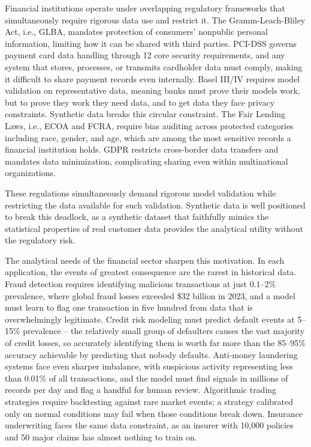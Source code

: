 Financial institutions operate under overlapping regulatory frameworks that simultaneously require rigorous data use and restrict it. The Gramm-Leach-Bliley Act, i.e., GLBA, mandates protection of consumers' nonpublic personal information, limiting how it can be shared with third parties. PCI-DSS governs payment card data handling through 12 core security requirements, and any system that stores, processes, or transmits cardholder data must comply, making it difficult to share payment records even internally. Basel III/IV requires model validation on representative data, meaning banks must prove their models work, but to prove they work they need data, and to get data they face privacy constraints. Synthetic data breaks this circular constraint. The Fair Lending Laws, i.e., ECOA and FCRA, require bias auditing across protected categories including race, gender, and age, which are among the most sensitive records a financial institution holds. GDPR restricts cross-border data transfers and mandates data minimization, complicating sharing even within multinational organizations.

These regulations simultaneously demand rigorous model validation while restricting the data available for such validation. Synthetic data is well positioned to break this deadlock, as a synthetic dataset that faithfully mimics the statistical properties of real customer data provides the analytical utility without the regulatory risk.

The analytical needs of the financial sector sharpen this motivation. In each application, the events of greatest consequence are the rarest in historical data. Fraud detection requires identifying malicious transactions at just 0.1--2\% prevalence, where global fraud losses exceeded \$32 billion in 2023, and a model must learn to flag one transaction in five hundred from data that is overwhelmingly legitimate. Credit risk modeling must predict default events at 5--15\% prevalence -- the relatively small group of defaulters causes the vast majority of credit losses, so accurately identifying them is worth far more than the 85--95\% accuracy achievable by predicting that nobody defaults. Anti-money laundering systems face even sharper imbalance, with suspicious activity representing less than 0.01\% of all transactions, and the model must find signals in millions of records per day and flag a handful for human review. Algorithmic trading strategies require backtesting against rare market events; a strategy calibrated only on normal conditions may fail when those conditions break down. Insurance underwriting faces the same data constraint, as an insurer with 10,000 policies and 50 major claims has almost nothing to train on.

